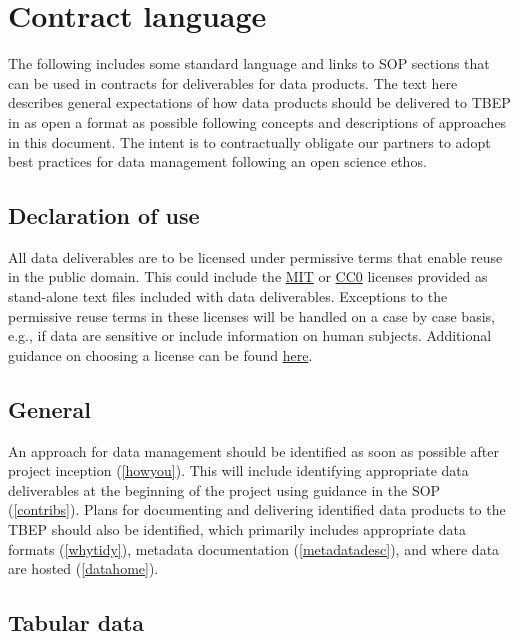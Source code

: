 \documentclass[
]{book}
\begin{document}
\section{Contract language}\label{contract-language}

The following includes some standard language and links to SOP sections that can be used in contracts for deliverables for data products. The text here describes general expectations of how data products should be delivered to TBEP in as open a format as possible following concepts and descriptions of approaches in this document. The intent is to contractually obligate our partners to adopt best practices for data management following an open science ethos.

\subsection{Declaration of use}\label{declaration-of-use}

All data deliverables are to be licensed under permissive terms that enable reuse in the public domain. This could include the \href{https://choosealicense.com/licenses/mit/}{MIT} or \href{https://choosealicense.com/licenses/cc0-1.0/}{CC0} licenses provided as stand-alone text files included with data deliverables. Exceptions to the permissive reuse terms in these licenses will be handled on a case by case basis, e.g., if data are sensitive or include information on human subjects. Additional guidance on choosing a license can be found \href{https://choosealicense.com/}{here}.

\subsection{General}\label{general}

An approach for data management should be identified as soon as possible after project inception (\ref{howyou}). This will include identifying appropriate data deliverables at the beginning of the project using guidance in the SOP (\ref{contribs}). Plans for documenting and delivering identified data products to the TBEP should also be identified, which primarily includes appropriate data formats (\ref{whytidy}), metadata documentation (\ref{metadatadesc}), and where data are hosted (\ref{datahome}).

\subsection{Tabular data}\label{tabular-data}
\end{document}
